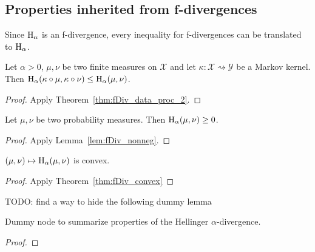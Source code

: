 \subsection{Properties inherited from f-divergences}

Since $\operatorname{H}_\alpha$ is an f-divergence, every inequality for f-divergences can be translated to $\operatorname{H}_\alpha$.

\begin{theorem}
  \label{thm:hellingerAlpha_data_proc}
  \leanok
  Let $\alpha > 0$, $\mu, \nu$ be two finite measures on $\mathcal X$ and let $\kappa : \mathcal X \rightsquigarrow \mathcal Y$ be a Markov kernel.
  Then $\operatorname{H}_\alpha(\kappa \circ \mu, \kappa \circ \nu) \le \operatorname{H}_\alpha(\mu, \nu)$.
\end{theorem}

\begin{proof} \leanok
{}
Apply Theorem~\ref{thm:fDiv_data_proc_2}.
\end{proof}


\begin{lemma}
  \label{lem:hellingerAlpha_nonneg}
  \leanok
  Let $\mu, \nu$ be two probability measures. Then $\operatorname{H}_\alpha(\mu, \nu) \ge 0$.
\end{lemma}

\begin{proof} \leanok
{}
Apply Lemma~\ref{lem:fDiv_nonneg}.
\end{proof}


\begin{lemma}
  \label{lem:hellingerAlpha_convex}
  $(\mu, \nu) \mapsto \operatorname{H}_\alpha(\mu, \nu)$ is convex.
\end{lemma}

\begin{proof}
Apply Theorem~\ref{thm:fDiv_convex}
\end{proof}



TODO: find a way to hide the following dummy lemma
\begin{lemma}
  \label{lem:hellingerAlpha_properties}
  \leanok
  Dummy node to summarize properties of the Hellinger $\alpha$-divergence.
\end{lemma}

\begin{proof}\leanok
{}
\end{proof}